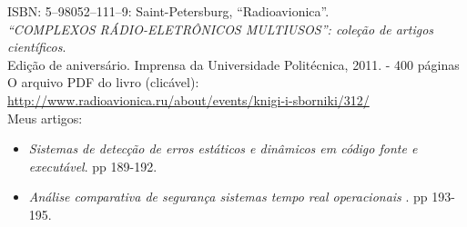 

\begin{minipage}[t]{0.76\textwidth}
    \vspace{-\baselineskip} %


    ISBN: 5–98052–111–9: Saint-Petersburg, \enquote{Radioavionica}.                                     \\
    \textit{\enquote{COMPLEXOS RÁDIO-ELETRÔNICOS MULTIUSOS}: coleção de artigos científicos}.\\
    Edição de aniversário. Imprensa da Universidade Politécnica, 2011. - 400 páginas                               \\
    O arquivo PDF do livro (clicável): \url{http://www.radioavionica.ru/about/events/knigi-i-sborniki/312/}\\
    Meus artigos:
    \begin{itemize}
        \setlength\itemsep{0em}
        \item \textit{Sistemas de detecção de erros estáticos e dinâmicos em código fonte e executável}. pp 189-192.
        \item \textit{Análise comparativa de segurança sistemas tempo real  operacionais }. pp 193-195.
    \end{itemize}

\end{minipage}
\hfill
\begin{minipage}[t]{0.2\textwidth}
    \vspace{-\baselineskip} %

    \\
    \\
    \\

\end{minipage}

\vspace{0.4cm}